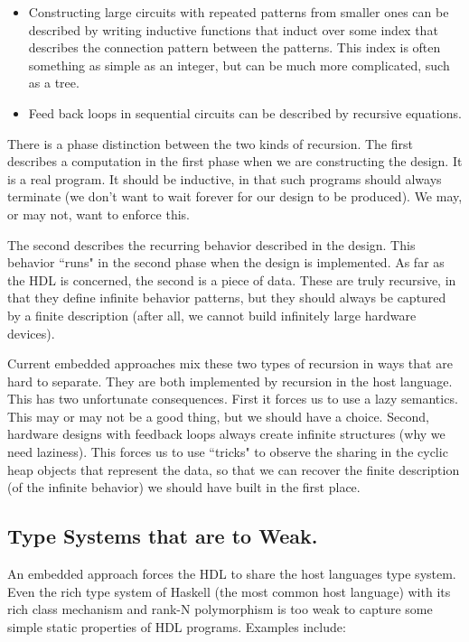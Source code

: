 \documentclass[10pt,twoside]{article}
\begin{document}
\begin{itemize}

\item Constructing large circuits with repeated patterns from smaller
ones can be described by writing inductive functions that induct over
some index that describes the connection pattern between the
patterns. This index is often something as simple as an integer, but
can be much more complicated, such as a tree.

\item Feed back loops in sequential circuits can be described by
recursive equations.

\end{itemize}

There is a phase distinction between the two kinds of recursion.
The first describes a computation in the first phase when we are
constructing the design. It is a real program. It should be inductive,
in that such programs should always terminate (we don't want to wait
forever for our design to be produced). We may, or may not, want to
enforce this.

The second describes the recurring behavior described in the design.
This behavior ``runs" in the second phase when the design is
implemented. As far as the HDL is concerned, the second is a piece of
data. These are truly recursive, in that they define infinite behavior
patterns, but they should always be captured by a finite description
(after all, we cannot build infinitely large hardware devices).

Current embedded approaches mix these two types of recursion in ways
that are hard to separate. They are both implemented by recursion in
the host language. This has two unfortunate consequences. First it
forces us to use a lazy semantics. This may or may not be a good
thing, but we should have a choice. Second, hardware designs with
feedback loops always create infinite structures (why we need
laziness). This forces us to use ``tricks" to observe the sharing in
the cyclic heap objects that represent the data, so that we can recover the
finite description (of the infinite behavior) we should have built
in the first place.
 
\subsection{Type Systems that are to Weak.}

An embedded approach forces the HDL to share the host languages type
system. Even the rich type system of Haskell (the most common host
language) with its rich class mechanism and rank-N polymorphism is
too weak to capture some simple static properties of HDL programs.
Examples include:
\end{document}
